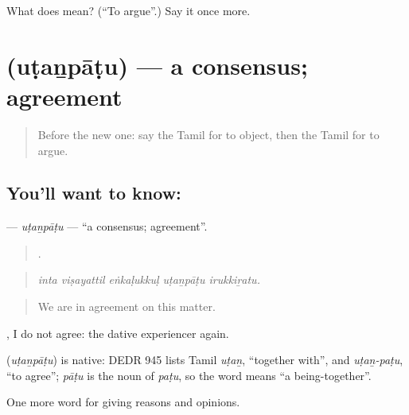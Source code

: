 \begin{tcolorbox}[breakable,colback=teal!4,colframe=teal!35!black,title={Before you move on}]
What does  mean? (\textquotedblleft{}To argue\textquotedblright{}.) Say it once more.
\end{tcolorbox}
\section[\texorpdfstring{\ta{உடன்பாடு} (uṭaṉpāṭu)}{உடன்பாடு (uṭaṉpāṭu)}]{ (uṭaṉpāṭu) — a consensus; agreement}

\label{lesson:TA-C348-utanpatu}



\begin{quote}
Before the new one: say the Tamil for to object, then the Tamil for to argue.
\end{quote}

\subsection*{You'll want to know: }
\textbf{} — \emph{uṭaṉpāṭu} — \textquotedblleft{}a consensus; agreement\textquotedblright{}.

\begin{quote}
    .
\end{quote}

\begin{quote}
\emph{inta viṣayattil eṅkaḷukkuḷ uṭaṉpāṭu irukkiṟatu.}
\end{quote}

\begin{quote}
We are in agreement on this matter.
\end{quote}

  , I do not agree: the dative experiencer again.

\begin{cousinweb}
\textbf{} (\emph{uṭaṉpāṭu}) is native: DEDR 945 lists Tamil \emph{uṭaṉ}, \textquotedblleft{}together with\textquotedblright{}, and \emph{uṭaṉ-paṭu}, \textquotedblleft{}to agree\textquotedblright{}; \emph{pāṭu} is the noun of \emph{paṭu}, so the word means \textquotedblleft{}a being-together\textquotedblright{}.
\end{cousinweb}

\begin{grammarlens}[title={What you've built}]
One more word for giving reasons and opinions.
\end{grammarlens}

